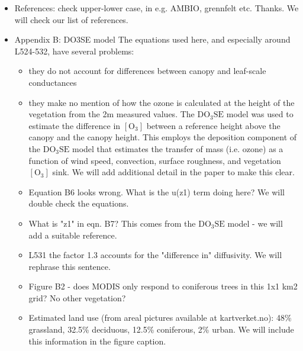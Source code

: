 \documentclass{scrartcl}
\begin{document}
\begin{itemize}
\item {\color{blue}References: check upper-lower case, in e.g. AMBIO, grennfelt etc.}
Thanks. We will check our list of references.
 
\item {\color{blue}Appendix B: DO3SE model
The equations used here, and especially around L524-532, have several problems:
\begin{itemize}
\item they do not account for differences between canopy and leaf-scale conductances
\item they make no mention of how the ozone is calculated at the height of the vegetation from the 2m measured values.
{\color{black}The $\mathrm{DO_3SE}$ model was used to estimate the difference in $[\mathrm{O_3}]$ between a reference height above the canopy and the canopy height. This employs the deposition component of the $\mathrm{DO_3SE}$ model that estimates the transfer of mass (i.e. ozone) as a function of wind speed, convection, surface roughness, and vegetation $[\mathrm{O_3}]$ sink. We will add additional detail in the paper to make this clear.}
\item Equation B6 looks wrong. What is the u(z1) term doing here?
{\color{black}We will double check the equations.}
\item What is "z1" in eqn. B7?
{\color{black}This comes from the $\mathrm{DO_3SE}$ model - we will add a suitable reference.}
\item L531 the factor 1.3 accounts for the "difference in" diffusivity.
{\color{black}We will rephrase this sentence.}
\item Figure B2 - does MODIS only respond to coniferous trees in this 1x1 km2 grid? No other vegetation?
\item  {\color{black}Estimated land use (from areal pictures available at kartverket.no): 48\% grassland, 32.5\% deciduous, 12.5\% coniferous, 2\% urban. We will include this information in the figure caption.}
\end{itemize}}
 
\end{itemize}
\end{document}
